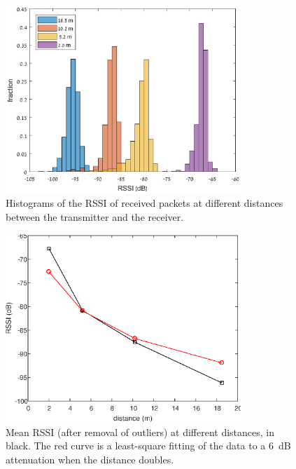 \begin{figure}[h]
    \centering
    \includegraphics[width=3.5in]{experiments/rssiHistograms.eps}
    \caption{Histograms of the RSSI of received packets at different distances between the transmitter and the receiver.}
    \label{fig:rssiHistograms}
\end{figure}

\begin{figure}[h]
    \centering
    \includegraphics[width=3.5in]{experiments/rssiDistance.eps}
    \caption{Mean RSSI (after removal of outliers) at different distances, in black. The red curve is a least-square
    fitting of the data to a 6~dB attenuation when the distance doubles.}
    \label{fig:rssiDistance}
\end{figure}

